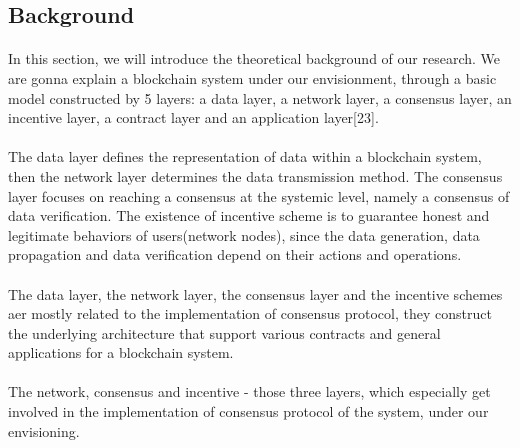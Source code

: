 \documentclass[doublespacing]{bmcart}
\begin{document}
\begin{CJK*}{UTF8}{gbsn}
\section{Background}
\paragraph{}
	In this section, we will introduce the theoretical background of our research. We are gonna explain a blockchain system under our envisionment, through a basic model constructed by 5 layers: a data layer, a network layer, a consensus layer, an incentive layer, a contract layer and an application layer[23].
\paragraph{} The data layer defines the representation of data within a blockchain system, then the network layer determines the data transmission method. The consensus layer focuses on reaching a consensus at the systemic level, namely a consensus of data verification. The existence of incentive scheme is to guarantee honest and legitimate behaviors of users(network nodes), since the data generation, data propagation and data verification depend on their actions and operations. 
\paragraph{} The data layer, the network layer, the consensus layer and the incentive schemes aer mostly related to the implementation of consensus protocol, they construct the underlying architecture that support various contracts and general applications for a blockchain system.
\paragraph{}	
	The network, consensus and incentive - those three layers, which especially get involved in the implementation of consensus protocol of the system, under our envisioning. 



\end{CJK*}
\end{document}
